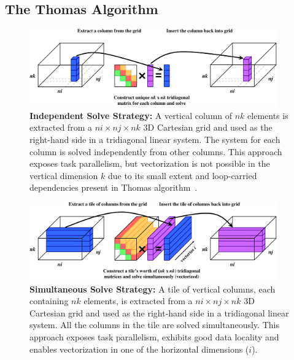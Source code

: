 \documentclass{sig-alternate-05-2015}
\begin{document}
\subsection{The Thomas Algorithm}
\label{sec:implementation:thomas_algorithm}

\begin{figure}[!bth]
  \centering
  \caption{
    \textbf{Independent Solve Strategy:} A vertical column of \(nk\) elements is
      extracted from a \(ni \times nj \times nk\) 3D Cartesian grid and used as
      the right-hand side in a tridiagonal linear system.
    The system for each column is solved independently from other columns.
    This approach exposes task parallelism, but vectorization is not possible
      in the vertical dimension \(k\) due to its small extent and loop-carried
      dependencies present in Thomas algorithm~\cite{povitsky}.
  }
  \label{fig:implementation:independent_solve_strategy}
  \vspace{1em}
  \includegraphics[width=0.95\textwidth]{figures/independent_solve.pdf}
\end{figure}

\begin{figure}[!bth]
  \centering
  \caption{
    \textbf{Simultaneous Solve Strategy:} A tile of vertical columns, each 
      containing \(nk\) elements, is extracted from a \(ni \times nj \times nk\)
      3D Cartesian grid and used as the right-hand side in a tridiagonal linear
      system.
    All the columns in the tile are solved simultaneously.
    This approach exposes task parallelism, exhibits good data locality and
      enables vectorization in one of the horizontal dimensions (\(i\)).
  }
  \label{fig:implementation:simultaneous_solve_strategy}
  \vspace{1em}
  \includegraphics[width=0.95\textwidth]{figures/simultaneous_solve.pdf}
\end{figure}
\end{document}
